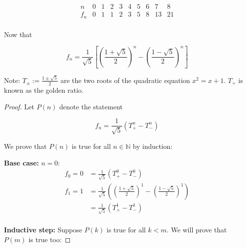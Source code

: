 \documentclass[11pt, draft]{article}
\begin{document}
\begin{enumerate}
          \[
              \begin{array}{c|c|c|c|c|c|c|c|c|c}
                  n   & 0 & 1 & 2 & 3 & 4 & 5 & 6 & 7  & 8  \\
                  \hline
                  f_n & 0 & 1 & 1 & 2 & 3 & 5 & 8 & 13 & 21 \\
              \end{array}
          \]

          Now that

          \[
              f_n = \frac{1}{\sqrt{5}} \left[ \left( \frac{1 + \sqrt{5}}{2} \right)^n - \left( \frac{1 - \sqrt{5}}{2} \right)^n \right]
          \]

          Note: $T_{\pm} := \frac{1 \pm \sqrt{5}}{2}$ are the two roots of the quadratic
          equation $x^2 = x + 1$. $T_+$ is known as the golden ratio.

          \begin{proof}

              Let $P(n)$ denote the statement

              \[
                  f_n = \frac{1}{\sqrt{5}} \left( T_+^n - T_-^n \right)
              \]

              We prove that $P(n)$ is true for all $n \in \mathbb{N}$ by induction:

              \textbf{Base case:} $n = 0$:
              \[
                  \begin{aligned}
                      f_0 = 0 & = \frac{1}{\sqrt{5}} \left( T_+^0 - T_-^0 \right)                                                                     \\
                      f_1 = 1 & = \frac{1}{\sqrt{5}} \left( \left( \frac{1 + \sqrt{5}}{2} \right)^1 - \left( \frac{1 - \sqrt{5}}{2} \right)^1 \right) \\
                              & = \frac{1}{\sqrt{5}} \left( T_+^1 - T_-^1 \right)
                  \end{aligned}
              \]
              \\\textbf{Inductive step:} Suppose $P(k)$ is true for all $k < m$. We will prove that $P(m)$ is true too:


\end{proof}
\end{enumerate}
\end{document}
